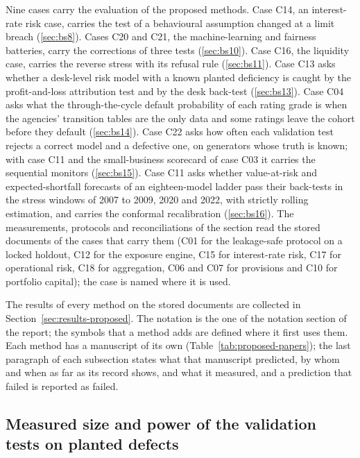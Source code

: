 Nine cases carry the evaluation of the proposed methods. Case C14, an interest-rate risk case, carries the test of a behavioural
assumption changed at a limit breach (\cref{sec:bs8}). Cases C20 and C21, the machine-learning and fairness batteries, carry the
corrections of three tests (\cref{sec:bs10}). Case C16, the liquidity case, carries the reverse stress with its refusal rule
(\cref{sec:bs11}). Case C13 asks whether a desk-level risk model with a known planted deficiency is caught by the profit-and-loss
attribution test and by the desk back-test (\cref{sec:bs13}). Case C04 asks what the through-the-cycle default probability of each
rating grade is when the agencies' transition tables are the only data and some ratings leave the cohort before they default
(\cref{sec:bs14}). Case C22 asks how often each validation test rejects a correct model and a defective one, on generators whose
truth is known; with case C11 and the small-business scorecard of case C03 it carries the sequential monitors (\cref{sec:bs15}).
Case C11 asks whether value-at-risk and expected-shortfall forecasts of an eighteen-model ladder pass their back-tests in the stress
windows of 2007 to 2009, 2020 and 2022, with strictly rolling estimation, and carries the conformal recalibration
(\cref{sec:bs16}). The measurements, protocols and reconciliations of the section read the stored documents of the cases that carry
them (C01 for the leakage-safe protocol on a locked holdout, C12 for the exposure engine, C15 for interest-rate risk, C17 for
operational risk, C18 for aggregation, C06 and C07 for provisions and C10 for portfolio capital); the case is named where it is used.

The results of every method on the stored documents are collected in Section~\ref{sec:results-proposed}. The notation is the one of
the notation section of the report; the symbols that a method adds are defined where it first uses them. Each method has a manuscript of its
own (Table~\ref{tab:proposed-papers}); the last paragraph of each subsection states what that manuscript predicted, by whom and when as far as its
record shows, and what it measured, and a prediction that failed is reported as failed.



\subsection{Measured size and power of the validation tests on planted defects}
\label{sec:bs1}

